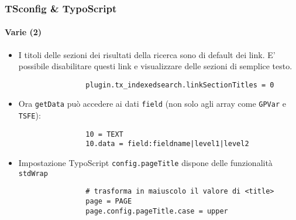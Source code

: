 \begin{frame}[fragile]
	\frametitle{TSconfig \& TypoScript}
	\framesubtitle{Varie (2)}

	\begin{itemize}

		\item I titoli delle sezioni dei risultati della ricerca sono di default dei link.
			E' possibile disabilitare questi link e visualizzare delle sezioni di semplice testo.

			\begin{lstlisting}
				plugin.tx_indexedsearch.linkSectionTitles = 0
			\end{lstlisting}

		\item Ora \texttt{getData} può accedere ai dati \texttt{field} (non solo agli array
			come \texttt{GPVar} e \texttt{TSFE}):
		
			\begin{lstlisting}
				10 = TEXT
				10.data = field:fieldname|level1|level2
			\end{lstlisting}

		\item Impostazione TypoScript  \texttt{config.pageTitle} dispone delle funzionalità \texttt{stdWrap}

			\begin{lstlisting}
				# trasforma in maiuscolo il valore di <title>
				page = PAGE
				page.config.pageTitle.case = upper
			\end{lstlisting}

	\end{itemize}

\end{frame}

